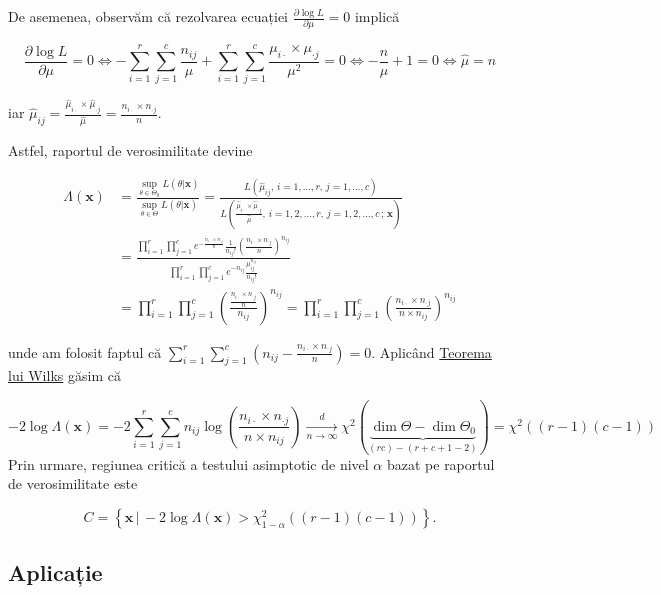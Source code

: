 \documentclass[]{article}
\begin{document}
De asemenea, observăm că rezolvarea ecuației
\(\frac{\partial \log{L}}{\partial \mu} = 0\) implică

\[
\frac{\partial \log{L}}{\partial \mu} = 0 \iff -\sum_{i = 1}^{r}\sum_{j = 1}^{c}\frac{n_{ij}}{\mu} + \sum_{i = 1}^{r}\sum_{j = 1}^{c}\frac{\mu_{i\cdot}\times \mu_{\cdot j}}{\mu^2} = 0 \iff -\frac{n}{\mu} + 1 = 0 \iff \boxed{\hat{\mu} = n}
\]

iar
\(\boxed{\hat{\mu}_{ij} = \frac{\hat{\mu}_{i\cdot}\times \hat{\mu}_{\cdot j}}{\hat{\mu}} = \frac{n_{i\cdot}\times n_{\cdot j}}{n}}\).

Astfel, raportul de verosimilitate devine

\begin{align*}
  \Lambda(\mathbf{x})&=\frac{\sup_{\theta\in\Theta_0}L(\theta|\mathbf{x})}{\sup_{\theta\in\Theta}L(\theta|\mathbf{x})} = \frac{L(\hat{\mu}_{ij},\,i = 1,\ldots,r,\,j = 1,\ldots,c)}{L\left(\frac{\hat{\mu}_{i\cdot}\times \hat{\mu}_{\cdot j}}{\hat{\mu}},\, i = 1,2,\ldots,r,\,j = 1,2,\ldots, c\,;\,\mathbf{x}\right)}\\
  &= \frac{\prod_{i = 1}^{r}\prod_{j = 1}^{c}e^{-\frac{n_{i\cdot}\times n_{\cdot j}}{n}}\frac{1}{n_{ij}!}\left(\frac{n_{i\cdot}\times n_{\cdot j}}{n}\right)^{n_{ij}}}{\prod_{i = 1}^{r}\prod_{j = 1}^{c}e^{-n_{ij}}\frac{\mu_{ij}^{n_{ij}}}{n_{ij}!}}\\
  &= \prod_{i = 1}^{r}\prod_{j = 1}^{c}\left(\frac{\frac{n_{i\cdot}\times n_{\cdot j}}{n}}{n_{ij}}\right)^{n_{ij}} = \prod_{i = 1}^{r}\prod_{j = 1}^{c}\left(\frac{n_{i\cdot}\times n_{\cdot j}}{n\times n_{ij}}\right)^{n_{ij}}
\end{align*}

unde am folosit faptul că
\(\sum_{i = 1}^{r}\sum_{j = 1}^{c}\left(n_{ij} - \frac{n_{i\cdot}\times n_{\cdot j}}{n}\right) = 0\).
Aplicând
\href{https://en.wikipedia.org/wiki/Likelihood-ratio_test}{Teorema lui
Wilks} găsim că

\[
  -2\log \Lambda(\mathbf{x}) = -2\sum_{i = 1}^{r}\sum_{j = 1}^{c} n_{ij}\log\left(\frac{n_{i\cdot}\times n_{\cdot j}}{n\times n_{ij}}\right) \underset{n\to\infty}{\overset{d}{\longrightarrow}}\chi^2(\underbrace{\dim{\Theta} - \dim{\Theta_0}}_{(rc)-(r+c+1-2)}) = \chi^2((r-1)(c-1))
\] Prin urmare, regiunea critică a testului asimptotic de nivel
\(\alpha\) bazat pe raportul de verosimilitate este

\[
  C = \left\{\mathbf{x} \,|\, -2\log \Lambda(\mathbf{x}) > \chi^2_{1-\alpha}((r-1)(c-1))\right\}.
\]

\subsection{Aplicație}\label{aplicatie}
\end{document}
